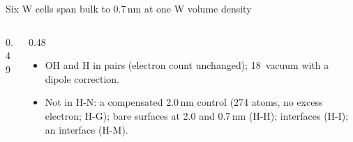 \begin{frame}{Six W cells span bulk to 0.7\,nm at one W volume density}
\begin{columns}[T,onlytextwidth]
\begin{column}{0.49\textwidth}
\begin{itemize}
      \end{itemize}
    \end{column}
    \begin{column}{0.48\textwidth}
      \begin{itemize}
        \item OH and H in pairs (electron count unchanged); 18\,\elevenAng{} vacuum with a dipole
          correction.
        \item Not in H-N: a compensated 2.0\,nm control (274 atoms, no excess electron; H-G); bare surfaces at 2.0
          and 0.7\,nm (H-H); \AlO{} interfaces (H-I); an \HfO{} interface (H-M).
      \end{itemize}
    \end{column}
  \end{columns}
\end{frame}

